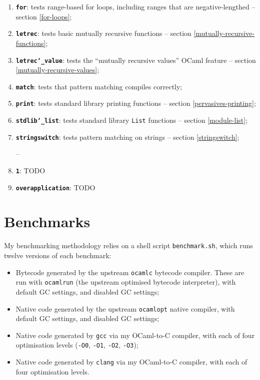 \documentclass[12pt,a4paper,twoside,openright]{report}
\begin{document}
\begin{enumerate}
    \item \textbf{\texttt{for}}: tests range-based for loops, including ranges
        that are negative-lengthed -- section \ref{for-loops};
    \item \textbf{\texttt{letrec}}: tests basic mutually recursive functions --
        section \ref{mutually-recursive-functions};
    \item \textbf{\texttt{letrec\char`_value}}: tests the ``mutually recursive
        values'' OCaml feature -- section \ref{mutually-recursive-values};
    \item \textbf{\texttt{match}}: tests that pattern matching compiles
        correctly;
    \item \textbf{\texttt{print}}: tests standard library printing functions --
        section \ref{pervasives-printing};
    \item \textbf{\texttt{stdlib\char`_list}}: tests standard library
        \lstinline!List! functions -- section \ref{module-list};
    \item \textbf{\texttt{stringswitch}}: tests pattern matching on strings --
        section \ref{stringswitch};

--

    \item \textbf{\texttt{1}}: TODO
    \item \textbf{\texttt{overapplication}}: TODO
\end{enumerate}

\section{Benchmarks}

My benchmarking methodology relies on a shell script \lstinline!benchmark.sh!,
which runs twelve versions of each benchmark:

\begin{itemize}
    \item Bytecode generated by the upstream \lstinline!ocamlc! bytecode compiler. These are run with \lstinline!ocamlrun! (the upstream optimised bytecode interpreter), with default GC settings, and disabled GC settings;
    \item Native code generated by the upstream \lstinline!ocamlopt! native compiler, with default GC settings, and disabled GC settings;
    \item Native code generated by \lstinline!gcc! via my OCaml-to-C compiler, with each of four optimisation levels (\lstinline!-O0!, \lstinline!-O1!, \lstinline!-O2!, \lstinline!-O3!);
    \item Native code generated by \lstinline!clang! via my OCaml-to-C compiler, with each of four optimisation levels.
\end{itemize}
\end{document}

